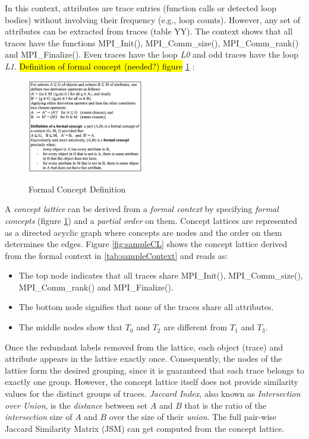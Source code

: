 %
In this context, attributes are trace entries (function calls or detected loop bodies) without involving their frequency (e.g., loop counts). However, any set of attributes can be extracted from traces (table YY). The context shows that all traces have the functions MPI\_Init(), MPI\_Comm\_size(), MPI\_Comm\_rank() and MPI\_Finalize(). Even traces have the loop \textit{L0} and odd traces have the loop \textit{L1}.
%
\hl{Definition of formal concept (needed?) figure }\ref{fig:formalConceptDefinition} :

\begin{figure}[]
\centering
\caption{Formal Concept Definition}
\includegraphics[width=0.45\textwidth]{figs/formalConceptDefinition.png}
\label{fig:formalConceptDefinition}
\end{figure}

A \textit{concept lattice} can be derived  from a \textit{formal context} by specifying \textit{formal concepts} (figure \ref{fig:formalConceptDefinition}) and a \textit{partial order} on them. Concept lattices are represented as a directed acyclic graph where concepts are nodes and the order on them determines the edges.
%
Figure \ref{fig:sampleCL} shows the concept lattice derived from the formal context in \ref{tab:sampleContext} and reads as:

\begin{itemize}
	\item The top node indicates that all traces share MPI\_Init(), MPI\_Comm\_size(), MPI\_Comm\_rank() and MPI\_Finalize().
	\item The bottom node signifies that none of the traces share all attributes. 
	\item The middle nodes show that $T_0$ and $T_2$ are different from  $T_1$ and $T_3$.
\end{itemize}




Once the redundant labels removed from the lattice, each object (trace) and attribute appears in the lattice exactly once. Consequently, the nodes of the lattice form the desired grouping, since it is guaranteed that each trace belongs to exactly one group. However, the concept lattice itself does not provide similarity values for the distinct groups of traces. \textit{Jaccard Index}, also known as \textit{Intersection over Union}, is the \textit{distance} between set $A$ and $B$ that is the ratio of the \textit{intersection} size of $A$ and $B$ over the size of their \textit{union}.  The full pair-wise Jaccard Similarity Matrix (JSM) can get computed from the concept lattice.
%




